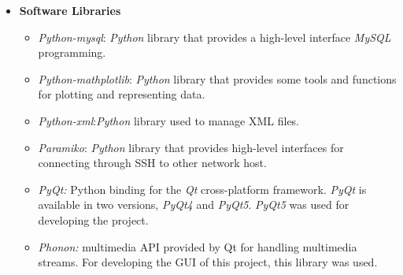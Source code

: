 \begin{itemize}
\item \textbf{Software Libraries}

\begin{itemize}
\item{\emph{Python-mysql}}: \emph{Python} library that provides a high-level interface
  \emph{MySQL} programming. 
\item{\emph{Python-mathplotlib}}: \emph{Python} library that provides some tools and
  functions for plotting and representing data. 
\item{\emph{Python-xml}}:\emph{Python} library used to manage \ac{XML} files.
\item{\emph{Paramiko}}: \emph{Python} library that provides high-level interfaces for
  connecting through \ac{SSH} to other network host. 
\item \emph{PyQt:} Python binding for the \emph{Qt} cross-platform framework. \emph{PyQt} is
  available in two versions, \emph{PyQt4} and \emph{PyQt5}. \emph{PyQt5} was used for developing the
  project. 
\item \emph{Phonon:} multimedia \ac{API} provided by Qt for handling multimedia
  streams. For developing the \ac{GUI} of this project, this library was used.
\end{itemize}
\end{itemize}
